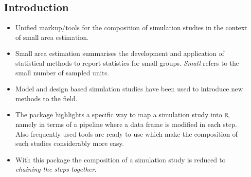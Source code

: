 \documentclass[a0,portrait]{a0poster}\usepackage[]{graphicx}\usepackage[]{color}
\newcommand{\mysec}[1]{\color{Black}\section*{#1}\color{DarkSlateGray}}
\newcommand{\code}[1]{\texttt{#1}}
\begin{document}
\begin{multicols}{2} %


\mysec{Introduction}
\color{NavyBlue}




\begin{multicols}{2}[\setlength{\columnseprule}{0pt}]

\begin{itemize}
  \item Unified markup/tools for the composition of simulation studies in the context of small area estimation.
  \item Small area estimation summarises the development and application of statistical methods to report statistics for small groups. \textit{Small} refers to the small number of sampled units.
  \item Model and design based simulation studies have been used to introduce new methods to the field.
  \item The package highlights a specific way to map a simulation study into \code{R}, namely in terms of a pipeline where a data frame is modified in each step. Also frequently used tools are ready to use which make the composition of such studies considerably more easy.
  \item With this package the composition of a simulation study is reduced to \textit{chaining the steps together}.
\end{itemize}

\columnbreak


\end{multicols}
\end{multicols}
\end{document}
